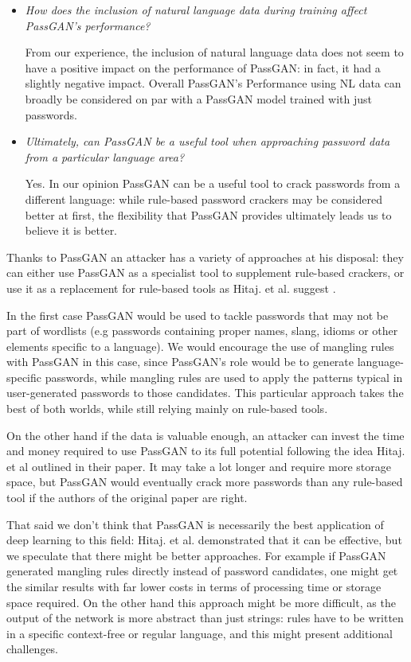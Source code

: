 \begin{itemize}
\item \emph{How does the inclusion of natural language data during training affect PassGAN's performance?}

From our experience, the inclusion of natural language data does not seem to have a positive impact on the performance of PassGAN: in fact, it had a slightly negative impact. Overall PassGAN's Performance using NL data can broadly be considered on par with a PassGAN model trained with just passwords.
\clearpage 
\item \emph{Ultimately, can PassGAN be a useful tool when approaching password data from a particular language area?} %

Yes. In our opinion PassGAN can be a useful tool to crack passwords from a different language: while rule-based password crackers may be considered better at first, the flexibility that PassGAN provides ultimately leads us to believe it is better.

\end{itemize}
Thanks to PassGAN an attacker has a variety of approaches at his disposal: they can either use PassGAN as a specialist tool to supplement rule-based crackers, or use it as a replacement for rule-based tools as Hitaj. et al. suggest \cite{PassGAN}. 

In the first case PassGAN would be used to tackle passwords that may not be part of wordlists (e.g passwords containing  proper names, slang, idioms or other elements specific to a language). 
We would encourage the use of mangling rules with PassGAN in this case, since  PassGAN's role would be to generate language-specific passwords, while mangling rules are used to apply the patterns typical in user-generated passwords to those candidates. This particular approach takes the best of both worlds, while still relying mainly on rule-based tools.

On the other hand if the data is valuable enough, an attacker can invest the time and money required to use PassGAN to its full potential following the idea Hitaj. et al \cite{PassGAN} outlined in their paper. It may take a lot longer and require more storage space, but PassGAN would eventually crack more passwords than any rule-based tool if the authors of the original paper are right.

That said we don't think that PassGAN is necessarily the best application of deep learning to this field: Hitaj. et al. demonstrated that it can be effective, but we speculate that there might be better approaches. For example if PassGAN generated mangling rules directly instead of password candidates, one might get the similar results with far lower costs in terms of processing time or storage space required.
On the other hand this approach might be more difficult, as the output of the network is more abstract than just strings: rules have to be written in a specific context-free or regular language, and this might present additional challenges.

